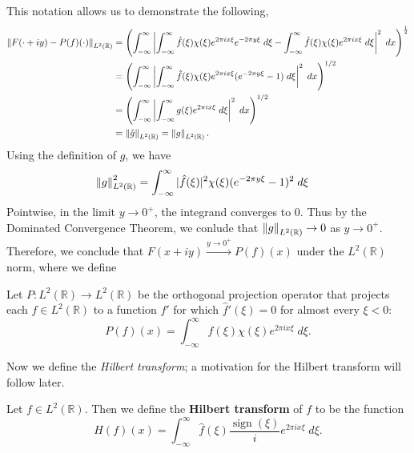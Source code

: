 \documentclass{article}
\begin{document}
This notation allows us to demonstrate the following, 
\begin{align*}
	\begin{split}
		\left\Vert F(\cdot + iy) - P(f)(\cdot) \right\Vert_{L^{2}(\mathbb{R})} &= 
		\left(\int_{-\infty}^{\infty}\left| \int_{-\infty}^{\infty}\hat{f}(\xi)\chi(\xi)e^{2\pi i x \xi}e^{-2\pi y \xi}\;d\xi - \int_{-\infty}^{\infty}\hat{f}(\xi)\chi(\xi)e^{2\pi i x\xi}\;d\xi \right|^{2}\;dx\right)^{\frac{1}{2}} \\
		&= \left(\int_{-\infty}^{\infty}\left| \int_{-\infty}^{\infty}\hat{f}(\xi)\chi(\xi)e^{2\pi i x \xi}(e^{-2\pi y \xi} - 1)\;d\xi \right|^{2}\;dx\right)^{1/2} \\
		&= \left(\int_{-\infty}^{\infty}\left| \int_{-\infty}^{\infty}g(\xi)e^{2\pi i x \xi}\;d\xi \right|^{2}\;dx\right)^{1/2} \\
		&= \left\Vert \check{g} \right\Vert_{L^{2}(\mathbb{R})} = \left\Vert g \right\Vert_{L^{2}(\mathbb{R})}. 
	\end{split} 
\end{align*}
Using the definition of $g$, we have 
\begin{align*}
	\begin{split}
		\left\Vert g \right\Vert_{L^{2}(\mathbb{R})}^{2} &= \int_{-\infty}^{\infty}|\hat{f}(\xi)|^{2}\chi(\xi)(e^{-2\pi y \xi} - 1)^{2}\;d\xi 
	\end{split} 
\end{align*}
Pointwise, in the limit $y \to 0^{+}$, the integrand converges to $0$. Thus by the Dominated Convergence Theorem, we conlude that $\left\Vert g \right\Vert_{L^{2}(\mathbb{R})} \to 0$ as $y \to 0^{+}$. Therefore, we conclude that $F(x + iy) \xrightarrow{y \to 0^{+}} P(f)(x)$ under the $L^{2}(\mathbb{R})$ norm, where we define 
\begin{definition}
	Let $P: L^{2}(\mathbb{R}) \to L^{2}(\mathbb{R})$ be the orthogonal projection operator that projects each $f \in L^{2}(\mathbb{R})$ to a function $f'$ for which $\hat{f}'(\xi) = 0$ for almost every $\xi < 0$: 
	\begin{equation*}
		P(f)(x) = \int_{-\infty}^{\infty}\hat{f}(\xi)\chi(\xi)e^{2\pi i x\xi}\;d\xi. 
	\end{equation*}
\end{definition} 
Now we define the \textit{Hilbert transform}; a motivation for the Hilbert transform will follow later. 
\begin{definition}
	Let $f \in L^{2}(\mathbb{R})$. Then we define the \textbf{Hilbert transform} of $f$ to be the function 
	\begin{equation}
		H(f)(x) = \int_{-\infty}^{\infty}\hat{f}(\xi)\frac{\operatorname{sign}(\xi)}{i}e^{2\pi i x\xi}\;d\xi. 
		\label{eq:HilbertTransform1}
	\end{equation}
\end{definition} 
\end{document}
